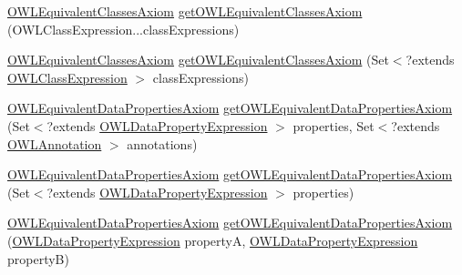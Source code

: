 \begin{DoxyCompactItemize}
\item 
\hyperlink{interfaceorg_1_1semanticweb_1_1owlapi_1_1model_1_1_o_w_l_equivalent_classes_axiom}{O\-W\-L\-Equivalent\-Classes\-Axiom} \hyperlink{classuk_1_1ac_1_1manchester_1_1cs_1_1owl_1_1owlapi_1_1_o_w_l_data_factory_impl_a3495292e7bcd2f48074aee77df5d2377}{get\-O\-W\-L\-Equivalent\-Classes\-Axiom} (O\-W\-L\-Class\-Expression...\-class\-Expressions)
\item 
\hyperlink{interfaceorg_1_1semanticweb_1_1owlapi_1_1model_1_1_o_w_l_equivalent_classes_axiom}{O\-W\-L\-Equivalent\-Classes\-Axiom} \hyperlink{classuk_1_1ac_1_1manchester_1_1cs_1_1owl_1_1owlapi_1_1_o_w_l_data_factory_impl_a1f5eea7d8daa5d39f5e15985f0bd44ac}{get\-O\-W\-L\-Equivalent\-Classes\-Axiom} (Set$<$?extends \hyperlink{interfaceorg_1_1semanticweb_1_1owlapi_1_1model_1_1_o_w_l_class_expression}{O\-W\-L\-Class\-Expression} $>$ class\-Expressions)
\item 
\hyperlink{interfaceorg_1_1semanticweb_1_1owlapi_1_1model_1_1_o_w_l_equivalent_data_properties_axiom}{O\-W\-L\-Equivalent\-Data\-Properties\-Axiom} \hyperlink{classuk_1_1ac_1_1manchester_1_1cs_1_1owl_1_1owlapi_1_1_o_w_l_data_factory_impl_a6b182b3ba18860257543e8ea8a3b0294}{get\-O\-W\-L\-Equivalent\-Data\-Properties\-Axiom} (Set$<$?extends \hyperlink{interfaceorg_1_1semanticweb_1_1owlapi_1_1model_1_1_o_w_l_data_property_expression}{O\-W\-L\-Data\-Property\-Expression} $>$ properties, Set$<$?extends \hyperlink{interfaceorg_1_1semanticweb_1_1owlapi_1_1model_1_1_o_w_l_annotation}{O\-W\-L\-Annotation} $>$ annotations)
\item 
\hyperlink{interfaceorg_1_1semanticweb_1_1owlapi_1_1model_1_1_o_w_l_equivalent_data_properties_axiom}{O\-W\-L\-Equivalent\-Data\-Properties\-Axiom} \hyperlink{classuk_1_1ac_1_1manchester_1_1cs_1_1owl_1_1owlapi_1_1_o_w_l_data_factory_impl_afbefb7405f98765ea988f73a655b3083}{get\-O\-W\-L\-Equivalent\-Data\-Properties\-Axiom} (Set$<$?extends \hyperlink{interfaceorg_1_1semanticweb_1_1owlapi_1_1model_1_1_o_w_l_data_property_expression}{O\-W\-L\-Data\-Property\-Expression} $>$ properties)
\item 
\hyperlink{interfaceorg_1_1semanticweb_1_1owlapi_1_1model_1_1_o_w_l_equivalent_data_properties_axiom}{O\-W\-L\-Equivalent\-Data\-Properties\-Axiom} \hyperlink{classuk_1_1ac_1_1manchester_1_1cs_1_1owl_1_1owlapi_1_1_o_w_l_data_factory_impl_a0942fd33b7d79282c387e814db0dd66a}{get\-O\-W\-L\-Equivalent\-Data\-Properties\-Axiom} (\hyperlink{interfaceorg_1_1semanticweb_1_1owlapi_1_1model_1_1_o_w_l_data_property_expression}{O\-W\-L\-Data\-Property\-Expression} property\-A, \hyperlink{interfaceorg_1_1semanticweb_1_1owlapi_1_1model_1_1_o_w_l_data_property_expression}{O\-W\-L\-Data\-Property\-Expression} property\-B)

\end{DoxyCompactItemize}
